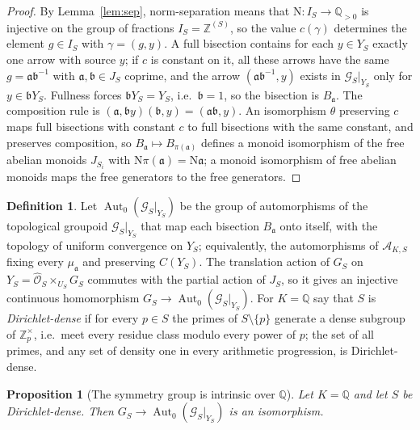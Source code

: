 \documentclass[11pt]{amsart}
\numberwithin{equation}{section}
\newtheorem{proposition}[theorem]{Proposition}
\theoremstyle{definition}
\newtheorem{definition}[theorem]{Definition}
\theoremstyle{remark}
\newcommand{\Z}{\mathbb{Z}}
\newcommand{\Q}{\mathbb{Q}}
\newcommand{\cA}{\mathcal{A}}
\newcommand{\cG}{\mathcal{G}}
\newcommand{\cO}{\mathcal{O}}
\newcommand{\aaa}{\mathfrak{a}}
\newcommand{\bb}{\mathfrak{b}}
\newcommand{\Ns}{\mathrm{N}}
\begin{document}
\begin{proof}
By Lemma~\ref{lem:sep}, norm-separation means that $\Ns:I_S\to\Q_{>0}$ is injective on the
group of fractions $I_S=\Z^{(S)}$, so the value $c(\gamma)$ determines the element
$g\in I_S$ with $\gamma=(g,y)$. A full bisection contains for each $y\in Y_S$ exactly one
arrow with source $y$; if $c$ is constant on it, all these arrows have the same $g=\aaa\bb^{-1}$
with $\aaa,\bb\in J_S$ coprime, and the arrow $(\aaa\bb^{-1},y)$ exists in $\cG_S|_{Y_S}$ only
for $y\in\bb Y_S$. Fullness forces $\bb Y_S=Y_S$, i.e.\ $\bb=1$, so the bisection is $B_\aaa$.
The composition rule is $(\aaa,\bb y)(\bb,y)=(\aaa\bb,y)$. An isomorphism $\theta$ preserving $c$ maps full
bisections with constant $c$ to full bisections with the same constant, and preserves
composition, so $B_\aaa\mapsto B_{\pi(\aaa)}$ defines a monoid isomorphism of the free
abelian monoids $J_{S_i}$ with $\Ns\pi(\aaa)=\Ns\aaa$; a monoid isomorphism of free abelian
monoids maps the free generators to the free generators.
\end{proof}

\begin{definition}\label{def:frobdense}
Let $\operatorname{Aut}_0(\cG_S|_{Y_S})$ be the group of automorphisms of the topological
groupoid $\cG_S|_{Y_S}$ that map each bisection $B_\aaa$ onto itself, with the topology of
uniform convergence on $Y_S$; equivalently, the automorphisms of $\cA_{K,S}$ fixing every
$\mu_\aaa$ and preserving $C(Y_S)$. The translation action of $G_S$ on
$Y_S=\widehat{\cO}_S\times_{U_S}G_S$ commutes with the partial action of $J_S$, so it gives an
injective continuous homomorphism $G_S\to\operatorname{Aut}_0(\cG_S|_{Y_S})$. For $K=\Q$ say
that $S$ is \emph{Dirichlet-dense} if for every $p\in S$ the primes of $S\setminus\{p\}$
generate a dense subgroup of $\Z_p^\times$, i.e.\ meet every residue class modulo every
power of $p$; the set of all primes, and any set of density one in every arithmetic
progression, is Dirichlet-dense.
\end{definition}

\begin{proposition}[The symmetry group is intrinsic over $\Q$]\label{prop:aut}
Let $K=\Q$ and let $S$ be Dirichlet-dense. Then $G_S\to\operatorname{Aut}_0(\cG_S|_{Y_S})$ is an
isomorphism.
\end{proposition}
\end{document}
